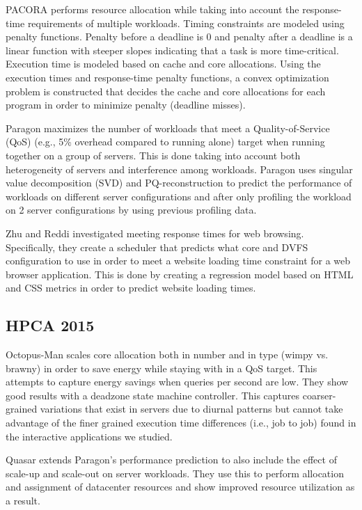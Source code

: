 PACORA \cite{pacora-hotpar11} performs resource allocation while taking into
account the response-time requirements of multiple workloads.  Timing
constraints are modeled using penalty functions. Penalty before a deadline is 0
and penalty after a deadline is a linear function with steeper slopes
indicating that a task is more time-critical. Execution time is modeled based
on cache and core allocations. Using the execution times and response-time
penalty functions, a convex optimization problem is constructed that decides
the cache and core allocations for each program in order to minimize penalty
(deadline misses).

Paragon \cite{paragon-asplos13} maximizes the number of workloads that meet a
Quality-of-Service (QoS) (e.g., 5\% overhead compared to running alone) target
when running together on a group of servers. This is done taking into account
both heterogeneity of servers and interference among workloads. Paragon uses
singular value decomposition (SVD) and PQ-reconstruction to predict the
performance of workloads on different server configurations and after only
profiling the workload on 2 server configurations by using previous profiling
data.

Zhu and Reddi \cite{zhu-hpca13} investigated meeting response times for 
web browsing.  Specifically, they create a scheduler that predicts what core
and DVFS configuration to use in order to meet a website loading time
constraint for a web browser application. This is done by creating a regression
model based on HTML and CSS metrics in order to predict website loading times.

\subsection{HPCA 2015}

Octopus-Man \cite{octopusman-hpca15} scales core allocation both in number and
in type (wimpy vs. brawny) in order to save energy while staying with in a QoS
target. This attempts to capture energy savings when queries per second are
low. They show good results with a deadzone state machine controller. This
captures coarser-grained variations that exist in servers due to diurnal
patterns but cannot take advantage of the finer grained execution time
differences (i.e., job to job) found in the interactive applications we
studied.

Quasar \cite{quasar-asplos14} extends Paragon's \cite{paragon-asplos13}
performance prediction to also include the effect of scale-up and scale-out on
server workloads. They use this to perform allocation and assignment of
datacenter resources and show improved resource utilization as a result.

